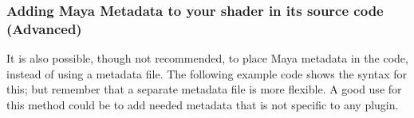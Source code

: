 \subsubsection{Adding Maya Metadata to your shader in its source code (Advanced)}

It is also possible, though not recommended, to place Maya metadata
in the code, instead of using a metadata file. The following example
code shows the syntax for this; but remember that
a separate metadata file is more flexible.
A good use for this method could be to add needed metadata that is not specific to any plugin.

\inputminted[mathescape,
numbersep=5pt,
frame=lines,
framesep=2mm,
baselinestretch=1,
fontsize=\footnotesize,
tabsize=3,
label=mayaShader.cpp,
firstline=9,
lastline=20]
{cpp}{mayaShader.cpp}
